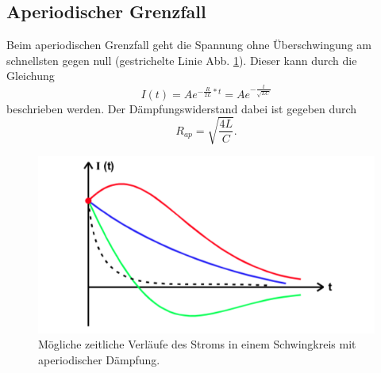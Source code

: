 \subsection{Aperiodischer Grenzfall}
Beim aperiodischen Grenzfall geht die Spannung ohne Überschwingung am schnellsten gegen null
(gestrichelte Linie Abb. \ref{fig:ap_gr}). Dieser kann durch die Gleichung
\begin{equation} 
    I(t)=A e^{-\frac{R}{2L}*t}= A e^{-\frac{t}{\sqrt{LC}}}
\end{equation}
beschrieben werden.
Der Dämpfungswiderstand dabei ist gegeben durch
\begin{equation}
    R_{ap} = \sqrt{\frac{4L}{C}}.
    \label{eqn:r_ap}
\end{equation}
\begin{figure}
  \centering
  \includegraphics{build/ap_grenzfall.png}
  \caption{Mögliche zeitliche Verläufe des Stroms in einem Schwingkreis mit aperiodischer Dämpfung.}
  \label{fig:ap_gr}
\end{figure}

